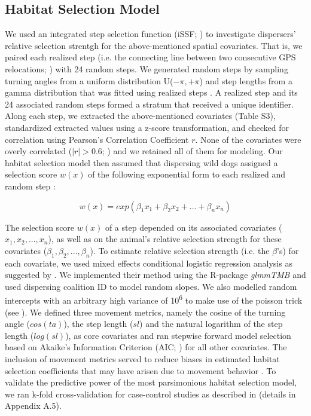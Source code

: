 \documentclass[abstract=on,10pt,a4paper,bibliography=totocnumbered]{article}
\begin{document}
\subsection{Habitat Selection Model}
We used an integrated step selection function (iSSF; \citealp{Avgar.2016}) to
investigate dispersers' relative selection strentgh  for the
above-mentioned spatial covariates. That is, we paired each realized step (i.e.
the connecting line between two consecutive GPS relocations;
\citealp{Turchin.1998}) with 24 random steps. We generated random steps by
sampling turning angles from a uniform distribution U(\(-\pi, +\pi\)) and step
lengths from a gamma distribution that was fitted using realized steps
\citep{Avgar.2016}. A realized step and its 24 associated random steps formed a
stratum that received a unique identifier. Along each step, we extracted the
above-mentioned covariates (Table S3), standardized extracted values using a
z-score transformation, and checked for correlation using Pearson's Correlation
Coefficient \(r\). None of the covariates were overly correlated (\(|r| > 0.6\);
\citealp{Latham.2011}) and we retained all of them for modeling. Our habitat
selection model then assumed that dispersing wild dogs assigned a selection
score \(w(x)\) of the following exponential form to each realized and random
step \citep{Fortin.2005}:

\begin{equation}
\label{EQ1}
  w(x) = exp(\beta_1 x_1 + \beta_2 x_2 + ... + \beta_n x_n)
\end{equation}

\noindent The selection score \(w(x)\) of a step depended on its associated
covariates (\(x_1, x_2, ..., x_n\)), as well as on the animal's relative
selection strength  for these covariates (\(\beta_1,
\beta_2, ..., \beta_n\)). To estimate relative selection strength  (i.e. the \(\beta\)'s) for each covariate, we used mixed effects
conditional logistic regression analysis as suggested by \cite{Muff.2020}. We
implemented their method using the R-package \textit{glmmTMB}
\citep{Mollie.2017} and used dispersing coalition ID to model random slopes. We
also modelled random intercepts with an arbitrary high variance of
10\textsuperscript{6} to make use of the poisson trick (see
\citealp{Muff.2020}). We defined three movement metrics, namely the cosine of
the turning angle (\(cos(ta)\)), the step length (\(sl\)) and the natural
logarithm of the step length (\(log(sl)\)), as core covariates and ran stepwise
forward model selection based on Akaike's Information Criterion (AIC;
\citealp{Burnham.2002}) for all other covariates.
The inclusion of movement metrics served to reduce biases in estimated habitat
selection coefficients  that may have arisen due to
movement behavior \citep{Avgar.2016}. To validate the predictive power of the
most parsimonious habitat selection model, we ran k-fold cross-validation for
case-control studies as described in \cite{Fortin.2009} (details in Appendix
A.5).
\end{document}
